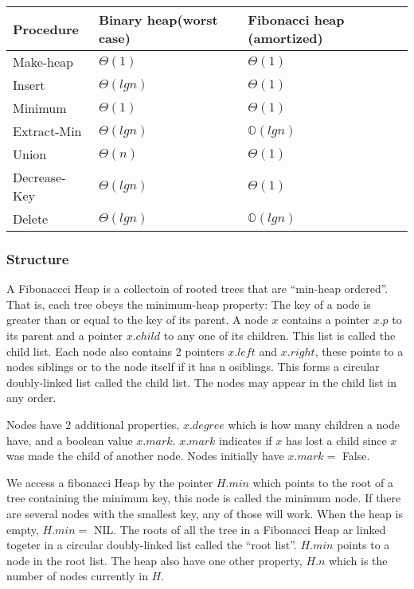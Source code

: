 \begin{table}[h]
\begin{tabular}{lll}
  Procedure    & Binary heap(worst case) & Fibonacci heap (amortized) \\ \hline
  Make-heap    & $\Theta(1)$             & $\Theta(1)$ \\
  Insert       & $\Theta(lg n)$          & $\Theta(1)$ \\
  Minimum      & $\Theta(1)$             & $\Theta(1)$ \\
  Extract-Min  & $\Theta(lg n)$          & $\mathbb{O}(lg n)$ \\
  Union        & $\Theta(n)$             & $\Theta(1)$ \\
  Decrease-Key & $\Theta(lg n)$          & $\Theta(1)$ \\
  Delete       & $\Theta(lg n)$          & $\mathbb{O}(lg n)$
\end{tabular}
\end{table}

\subsubsection{Structure}

A Fibonaccci Heap is a collectoin of rooted trees that are ``min-heap
ordered''. That is, each tree obeys the minimum-heap property: The key of a node
is greater than or equal to the key of its parent. A node $x$ contains a pointer
$x.p$ to its parent and a pointer $x.child$ to any one of its children. This
list is called the child list. Each node also contains 2 pointers $x.left$ and
$x.right$, these points to a nodes siblings or to the node itself if it has n
osiblings. This forms a circular doubly-linked list called the child list. The
nodes may appear in the child list in any order.

Nodes have 2 additional properties, $x.degree$ which is how many children a node
have, and a boolean value $x.mark$. $x.mark$ indicates if $x$ has lost a child
since $x$ was made the child of another node. Nodes initially have $x.mark =$
False.


We access a fibonacci Heap by the pointer $H.min$ which points to the root of a
tree containing the minimum key, this node is called the minimum node. If there
are several nodes with the smallest key, any of those will work. When the heap
is empty, $H.min =$ NIL. The roots of all the tree in a Fibonacci Heap ar linked
togeter in a circular doubly-linked list called the ``root list''. $H.min$
points to a node in the root list. The heap also have one other property, $H.n$
which is the number of nodes currently in $H$.

